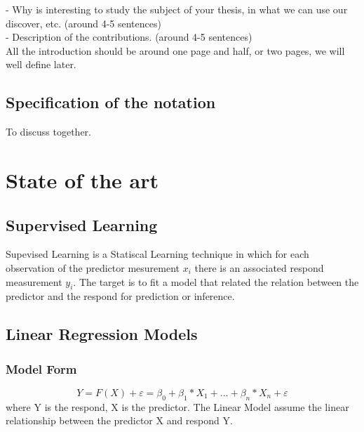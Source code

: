 \documentclass[11pt]{article}
\newcommand{\msb}[1]{{\color{blue}#1}}
\begin{document}
- Why is interesting to study the subject of your thesis, in what we can use our discover, etc. (around 4-5 sentences)\\

- Description of the contributions. (around 4-5 sentences)\\

All the introduction should be around one page and half, or two pages, we will well define later.

\subsection{Specification of the notation}

To discuss together.

\section{State of the art}
\subsection{Supervised Learning}
Supevised Learning is a Statiscal Learning technique in which for each observation of the predictor mesurement $x_i$ there is an associated respond measurement $y_i$.\cite[p. 26]{james_introduction_2013} The target is to fit a model that related the relation between the predictor and the respond for prediction or inference.


\subsection{Linear Regression Models}
\subsubsection{Model Form}
\begin{equation*}
Y=F(X)+\varepsilon=\beta_0 + \beta_1*X_1 + ... + \beta_n*X_n + \varepsilon
\end{equation*}
where Y is the respond, X is the predictor. The Linear Model assume the linear relationship between the predictor X and respond Y. \cite{james_introduction_2013}
\end{document}
